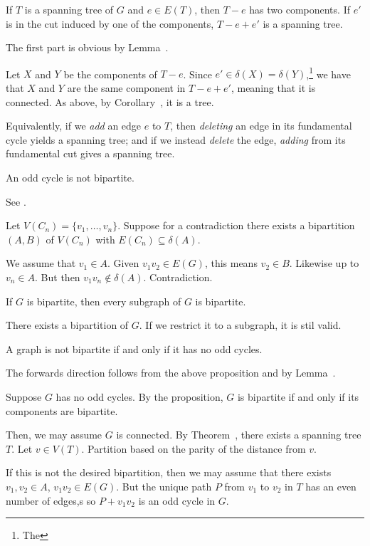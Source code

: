 \documentclass[class=math239,notes,tikz]{agony}
\begin{document}
\begin{theorem}[5.2.4]
  If $T$ is a spanning tree of $G$ and $e \in E(T)$,
  then $T-e$ has two components.
  If $e'$ is in the cut induced by one of the components,
  $T-e+e'$ is a spanning tree.
\end{theorem}
\begin{prf}
  The first part is obvious by Lemma~.

  Let $X$ and $Y$ be the components of $T-e$.
  Since $e' \in \delta(X) = \delta(Y)$,\footnote{The }
  we have that $X$ and $Y$ are the same component
  in $T-e+e'$, meaning that it is connected.
  As above, by Corollary~, it is a tree.
\end{prf}

Equivalently, if we \emph{add} an edge $e$ to $T$,
then \emph{deleting} an edge in its fundamental cycle yields a spanning tree;
and if we instead \emph{delete} the edge,
\emph{adding} from its fundamental cut gives a spanning tree.

\begin{lemma}[5.3.1]\label{lem:oddbi}
  An odd cycle is not bipartite.
\end{lemma}
\begin{prf}
  See .

  Let $V(C_n) = \{v_1,\dotsc,v_n\}$.
  Suppose for a contradiction there exists a bipartition
  $(A,B)$ of $V(C_n)$ with $E(C_n) \subseteq \delta(A)$.

  We assume \Wlog that $v_1 \in A$.
  Given $v_1v_2 \in E(G)$, this means $v_2 \in B$.
  Likewise up to $v_n \in A$.
  But then $v_1v_n \not\in \delta(A)$.
  Contradiction.
\end{prf}

\begin{prop}
  If $G$ is bipartite, then every subgraph of $G$ is bipartite.
\end{prop}
\begin{prf}
  There exists a bipartition of $G$.
  If we restrict it to a subgraph, it is stil valid.
\end{prf}

\begin{theorem}[5.3.2]\label{thm:oddbi}
  A graph is not bipartite if and only if it has no odd cycles.
\end{theorem}
\begin{prf}
  The forwards direction follows from the above proposition
  and by Lemma~.

  Suppose $G$ has no odd cycles.
  By the proposition, $G$ is bipartite if and only if its components are bipartite.

  Then, we may assume $G$ is connected.
  By Theorem~, there exists a spanning tree $T$.
  Let $v \in V(T)$.
  Partition based on the parity of the distance from $v$.

  If this is not the desired bipartition, then we may assume \Wlog
  that there exists $v_1,v_2 \in A$, $v_1v_2 \in E(G)$.
  But the unique path $P$ from $v_1$ to $v_2$ in $T$ has an even number of edges,s
  so $P + v_1v_2$ is an odd cycle in $G$.
\end{prf}
\end{document}
